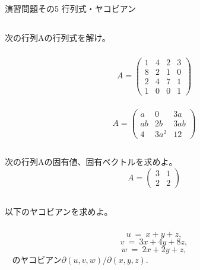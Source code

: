 \documentclass[a4paper,11pt,fleqn]{jarticle}
\begin{document}
\begin{center}
\begin{Large}
演習問題その5 行列式・ヤコビアン
\end{Large}
\end{center}

\subsection{}
次の行列Aの行列式を解け。
\subsubsection{}
\begin{equation*}
A=
\begin{pmatrix}
1 &4 &2 &3 \\
8 &2 &1 &0 \\
2 &4 &7 &1 \\
1 &0 &0 &1
\end{pmatrix}
\end{equation*}

\vspace{60mm}
\subsubsection{}
\begin{equation*}
A=
\begin{pmatrix}
a &0 &3a \\
ab &2b &3ab \\
4 &3a^2 &12
\end{pmatrix}
\end{equation*}

\newpage
\subsection{}
次の行列Aの固有値、固有ベクトルを求めよ。
\begin{equation*}
A=
\begin{pmatrix}
3 &1 \\
2 &2
\end{pmatrix}
\end{equation*}

\newpage
\subsection{}
以下のヤコビアンを求めよ。
\subsubsection{}
$$u ~=~ x+y+z,$$
$$v ~=~ 3x+4y+8z,$$
$$w ~=~ 2x+2y+z,$$
$~~~~$のヤコビアン$\partial (u,v,w)/\partial (x,y,z)$.
\end{document}

